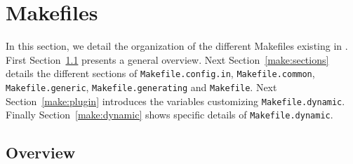 \section{Makefiles}\label{refman:make}

In this section, we detail the organization of the different Makefiles existing
in \framac. First Section~\ref{make:overview} presents a general overview. Next
Section~\ref{make:sections} details the different sections of
\texttt{Makefile.config.in}, \texttt{Makefile.common},
\texttt{Makefile.generic}, \texttt{Makefile.generating} and
\texttt{Makefile}. Next Section~\ref{make:plugin} introduces the variables
customizing \texttt{Makefile.dynamic}. Finally
Section~\ref{make:dynamic} shows specific details of \texttt{Makefile.dynamic}.

\subsection{Overview}\label{make:overview}

